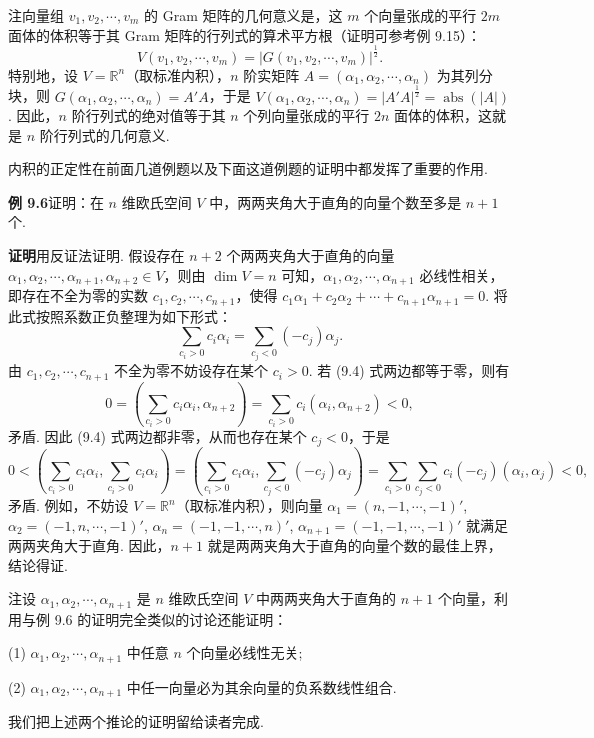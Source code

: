 \documentclass[UTF8,12pt,a4paper,fontset=fandol]{ctexart}
\begin{document}
注\quad 向量组 $v_1,v_2,\cdots,v_m$ 的 Gram 矩阵的几何意义是，这 $m$ 个向量张成的平行 $2m$ 面体的体积等于其 Gram 矩阵的行列式的算术平方根（证明可参考例 9.15）：
\[
V(v_1,v_2,\cdots,v_m)=|G(v_1,v_2,\cdots,v_m)|^{\frac12}.
\]
特别地，设 $V=\mathbb{R}^n$（取标准内积），$n$ 阶实矩阵 $A=(\alpha_1,\alpha_2,\cdots,\alpha_n)$ 为其列分块，则 $G(\alpha_1,\alpha_2,\cdots,\alpha_n)=A'A$，于是 $V(\alpha_1,\alpha_2,\cdots,\alpha_n)=|A'A|^{\frac12}=\operatorname{abs}(|A|)$. 因此，$n$ 阶行列式的绝对值等于其 $n$ 个列向量张成的平行 $2n$ 面体的体积，这就是 $n$ 阶行列式的几何意义.

内积的正定性在前面几道例题以及下面这道例题的证明中都发挥了重要的作用.

\noindent\textbf{例 9.6}\quad 证明：在 $n$ 维欧氏空间 $V$ 中，两两夹角大于直角的向量个数至多是 $n+1$ 个.

\noindent\textbf{证明}\quad 用反证法证明. 假设存在 $n+2$ 个两两夹角大于直角的向量 $\alpha_1,\alpha_2,\cdots,\alpha_{n+1},\alpha_{n+2}\in V$，则由 $\dim V=n$ 可知，$\alpha_1,\alpha_2,\cdots,\alpha_{n+1}$ 必线性相关，即存在不全为零的实数 $c_1,c_2,\cdots,c_{n+1}$，使得 $c_1\alpha_1+c_2\alpha_2+\cdots+c_{n+1}\alpha_{n+1}=0$. 将此式按照系数正负整理为如下形式：
\begin{equation}
\sum_{c_i>0}c_i\alpha_i=\sum_{c_j<0}(-c_j)\alpha_j.
\tag{9.4}
\end{equation}
由 $c_1,c_2,\cdots,c_{n+1}$ 不全为零不妨设存在某个 $c_i>0$. 若 (9.4) 式两边都等于零，则有
\[
0=\left(\sum_{c_i>0}c_i\alpha_i,\alpha_{n+2}\right)
=\sum_{c_i>0}c_i(\alpha_i,\alpha_{n+2})<0,
\]
矛盾. 因此 (9.4) 式两边都非零，从而也存在某个 $c_j<0$，于是
\[
0<\left(\sum_{c_i>0}c_i\alpha_i,\sum_{c_i>0}c_i\alpha_i\right)
=\left(\sum_{c_i>0}c_i\alpha_i,\sum_{c_j<0}(-c_j)\alpha_j\right)
=\sum_{c_i>0}\sum_{c_j<0}c_i(-c_j)(\alpha_i,\alpha_j)<0,
\]
矛盾. 例如，不妨设 $V=\mathbb{R}^n$（取标准内积），则向量 $\alpha_1=(n,-1,\cdots,-1)'$, $\alpha_2=(-1,n,\cdots,-1)'$, $\alpha_n=(-1,-1,\cdots,n)'$, $\alpha_{n+1}=(-1,-1,\cdots,-1)'$ 就满足两两夹角大于直角. 因此，$n+1$ 就是两两夹角大于直角的向量个数的最佳上界，结论得证.

注\quad 设 $\alpha_1,\alpha_2,\cdots,\alpha_{n+1}$ 是 $n$ 维欧氏空间 $V$ 中两两夹角大于直角的 $n+1$ 个向量，利用与例 9.6 的证明完全类似的讨论还能证明：

(1) $\alpha_1,\alpha_2,\cdots,\alpha_{n+1}$ 中任意 $n$ 个向量必线性无关;

(2) $\alpha_1,\alpha_2,\cdots,\alpha_{n+1}$ 中任一向量必为其余向量的负系数线性组合.

我们把上述两个推论的证明留给读者完成.
\end{document}
